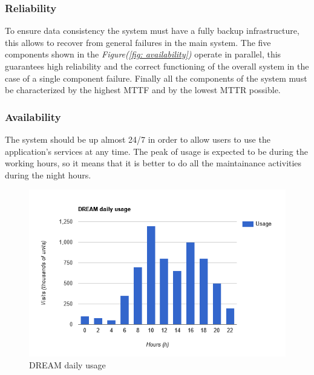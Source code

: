 \documentclass[table, 12pt]{article}
\begin{document}
\subsubsection{Reliability}
To ensure data consistency the system must have a fully backup infrastructure, this allows to recover from general failures in the main system.
The five components shown in the \textit{Figure(\ref{fig: availability})} operate in parallel, this guarantees high reliability and the correct functioning of the overall system in the case of a single component failure.
Finally all the components of the system must be characterized by the highest MTTF and by the lowest MTTR possible.

\subsubsection{Availability}
The system should be up almost 24/7 in order to allow users to use the application's services at any time.
The peak of usage is expected to be during the working hours, so it means that it is better to do all the maintainance activities during the night hours.

\begin{center}
    \begin{figure}[!h]
        \includegraphics[scale=0.60, center]{assets/bar-graph-daily-usage.png}
        \caption{DREAM daily usage}
        \label{fig: daily_usage}
    \end{figure}
\end{center}
\end{document}
